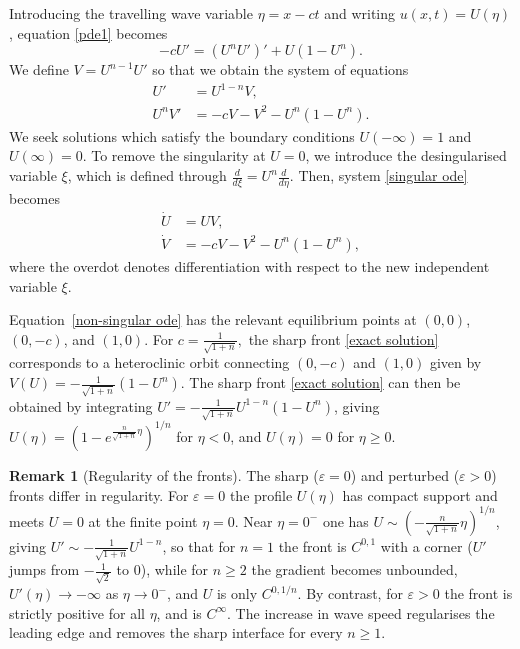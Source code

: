 \documentclass{article}
\theoremstyle{definition}
\numberwithin{equation}{section}
\newtheorem{remark}[prop]{Remark}
\begin{document}
Introducing the travelling wave variable $\eta=x-ct$ and writing $u(x,t)=U(\eta)$, equation \eqref{pde1} becomes
\begin{equation}
    -cU'=(U^nU')'+U(1-U^n).
    \label{tw ode}
\end{equation}
We define $V=U^{n-1}U'$ so that we obtain the system of equations
\begin{equation}
    \begin{aligned}
        U'&=U^{1-n}V,\\
        U^n V'&=-cV-V^2-U^n(1-U^n).
        \label{singular ode}
    \end{aligned}
\end{equation}
We seek solutions which satisfy the boundary conditions $U(-\infty)=1$ and $U(\infty)=0.$ To remove the singularity at $U=0$, we introduce the desingularised variable $\xi$, which is defined through $\tfrac{d}{d\xi}=U^n\tfrac{d}{d\eta}$. Then, system \eqref{singular ode} becomes
\begin{equation}
    \begin{aligned}
        \dot{U} &=UV,\\
        \dot{V} &=-cV-V^2-U^n(1-U^n),
        \label{non-singular ode}
    \end{aligned}
\end{equation}
where the overdot denotes differentiation with respect to the new independent variable $\xi$.

Equation~\eqref{non-singular ode} has the relevant equilibrium points at $(0,0)$, $(0, -c)$, and $(1,0)$. 
For $c=\tfrac{1}{\sqrt{1+n}},$ the sharp front \eqref{exact solution} corresponds to a heteroclinic orbit connecting $(0, -c)$ and $(1,0)$ given by $V(U)=-\tfrac{1}{\sqrt{1+n}}(1-U^n)$.
The sharp front \eqref{exact solution} can then be obtained by integrating $U'=-\tfrac{1}{\sqrt{1+n}}U^{1-n}(1-U^n)$, giving $U(\eta)=\left(1-e^{ \tfrac{n}{\sqrt{1+n}}\eta}\right)^{1/n} $ for $\eta< 0$, and $U(\eta)=0$ for $\eta\geq 0$.

\begin{remark}[Regularity of the fronts]
The sharp  ($\varepsilon=0$) and perturbed ($\varepsilon>0$) fronts differ in regularity. For $\varepsilon=0$ the profile
$U(\eta)$ has compact support and meets $U=0$ at the finite point $\eta=0$. Near $\eta=0^-$ one has $U\sim\left(-\tfrac{n}{\sqrt{1+n}}\eta\right)^{1/n}$,
giving $U'\sim -\tfrac{1}{\sqrt{1+n}}U^{1-n}$, so that for $n=1$ the front is $C^{0, 1}$
with a corner ($U'$ jumps from $-\tfrac{1}{\sqrt{2}}$ to $0$), while for $n\ge2$
the gradient becomes unbounded, $U'(\eta)\to-\infty$ as $\eta\to0^-$, and $U$ is only
$C^{0, 1/n}$. By contrast, for $\varepsilon>0$ the
front is strictly positive for all $\eta$, and is $C^\infty$. The
increase in wave speed regularises the leading edge and removes the sharp
interface for every $n\ge1$.
\end{remark}
\end{document}
